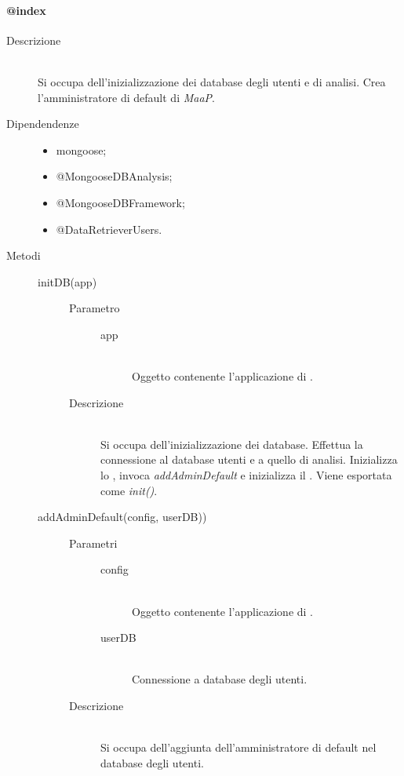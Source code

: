 \paragraph{@index}
\begin{description}
 \item[Descrizione] \hfill \\
 Si occupa dell'inizializzazione dei database degli utenti e di analisi. Crea l'amministratore di default di \textit{MaaP}.
 \item[Dipendendenze] \hfill
   \begin{itemize}
   \item mongoose;
   \item @MongooseDBAnalysis;
   \item @MongooseDBFramework;
   \item @DataRetrieverUsers.
   \end{itemize}
 \item[Metodi] \hfill
 \begin{description}
 \item[initDB(app)] \hfill 
 \begin{description}
    		\item[Parametro] \hfill
    			\begin{description}
    				\item[app] \hfill \\
    				Oggetto contenente l'applicazione di .
    			\end{description}
    		\item[Descrizione] \hfill \\
    		Si occupa dell'inizializzazione dei database. Effettua la connessione al database utenti e a quello di analisi. Inizializza lo , invoca \textit{addAdminDefault} e inizializza il . Viene esportata come \textit{init()}.
    	\end{description}
  \item[addAdminDefault(config, userDB))] \hfill 
  \begin{description}
      		\item[Parametri] \hfill
      			\begin{description}
      				\item[config] \hfill \\
      				Oggetto contenente l'applicazione di .
      				\item[userDB] \hfill \\
      				Connessione a database degli utenti.
      			\end{description}
      		\item[Descrizione] \hfill \\
      		Si occupa dell'aggiunta dell'amministratore di default nel database degli utenti.
      	\end{description}
  
 \end{description}
\end{description}

